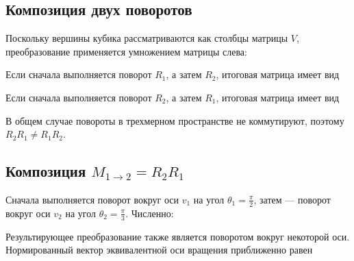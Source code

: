 \documentclass[a4paper,14pt]{extarticle}
\begin{document}
\subsection*{Композиция двух поворотов}

Поскольку вершины кубика рассматриваются как столбцы матрицы $V$, преобразование применяется умножением матрицы слева:

\begin{center}\end{center}

Если сначала выполняется поворот $R_1$, а затем $R_2$, итоговая матрица имеет вид

\begin{center}\end{center}

Если сначала выполняется поворот $R_2$, а затем $R_1$, итоговая матрица имеет вид

\begin{center}\end{center}

В общем случае повороты в трехмерном пространстве не коммутируют, поэтому $R_2R_1 \neq R_1R_2$.

\subsection*{Композиция $M_{1 \to 2} = R_2R_1$}

Сначала выполняется поворот вокруг оси $v_1$ на угол $\theta_1=\frac{\pi}{2}$, затем — поворот вокруг оси $v_2$ на угол $\theta_2=\frac{\pi}{3}$. Численно:

\begin{center}\end{center}

Результирующее преобразование также является поворотом вокруг некоторой оси. Нормированный вектор эквивалентной оси вращения приближенно равен
\end{document}
